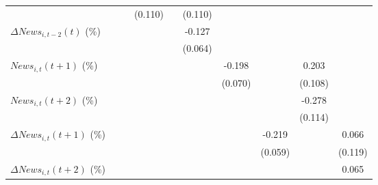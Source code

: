 {\begin{tabular}{l*{9}{c}}
                    &                     &                     &     (0.110)         &                     &     (0.110)         &                     &                     &                     &                     \\
\addlinespace
$ \Delta News_{i,t-2}(t)$ (\%)&                     &                     &                     &                     &      -0.127\sym{*}  &                     &                     &                     &                     \\
                    &                     &                     &                     &                     &     (0.064)         &                     &                     &                     &                     \\
\addlinespace
$ News_{i,t}(t+1)$ (\%)&                     &                     &                     &                     &                     &      -0.198\sym{***}&                     &       0.203\sym{*}  &                     \\
                    &                     &                     &                     &                     &                     &     (0.070)         &                     &     (0.108)         &                     \\
\addlinespace
$ News_{i,t}(t+2)$ (\%)&                     &                     &                     &                     &                     &                     &                     &      -0.278\sym{**} &                     \\
                    &                     &                     &                     &                     &                     &                     &                     &     (0.114)         &                     \\
\addlinespace
$ \Delta News_{i,t}(t+1)$ (\%)&                     &                     &                     &                     &                     &                     &      -0.219\sym{***}&                     &       0.066         \\
                    &                     &                     &                     &                     &                     &                     &     (0.059)         &                     &     (0.119)         \\
\addlinespace
$ \Delta News_{i,t}(t+2)$ (\%)&                     &                     &                     &                     &                     &                     &                     &                     &       0.065         \\

\end{tabular}}
